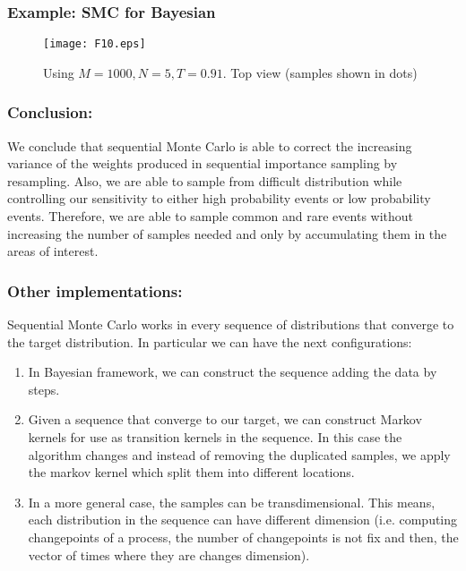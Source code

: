\documentclass[aspectratio=169]{beamer}\usepackage[utf8]{inputenc}
\begin{document}
\begin{frame}\frametitle{Example: SMC for Bayesian }
\begin{figure}[h!]
	\centering
		\texttt{[image: F10.eps]}
				\caption{Using $M=1000, N=5, T=0.91$. Top view  (samples shown in dots)    }
		\label{Ex2}
\end{figure}
\end{frame}

\begin{frame}\frametitle{Conclusion: }
 We conclude that sequential Monte Carlo is able to correct the increasing variance of the weights produced in sequential importance sampling by resampling. Also, we are able to sample from difficult distribution  while controlling our sensitivity to either high probability events or low probability events. Therefore, we are able to sample common and rare events without increasing the number of samples needed and only by accumulating them in the areas of interest.
\end{frame}

\begin{frame}\frametitle{Other implementations: }
Sequential Monte Carlo works in every sequence of distributions that converge to the target distribution. In particular we can have the next configurations:
\begin{enumerate}
\item In Bayesian framework, we can construct the sequence adding the data by steps.
\item Given a sequence that converge to our target, we can construct Markov kernels for use as transition kernels in the sequence. In this case the algorithm changes and instead of removing the duplicated samples, we apply the markov kernel which split them into different locations.
\item In a more general case, the samples can be transdimensional. This means, each distribution in the sequence can have different dimension (i.e. computing changepoints of a process, the number of changepoints is not fix and then, the vector of times where they are changes dimension).

\end{enumerate}


\end{frame}
\end{document}
